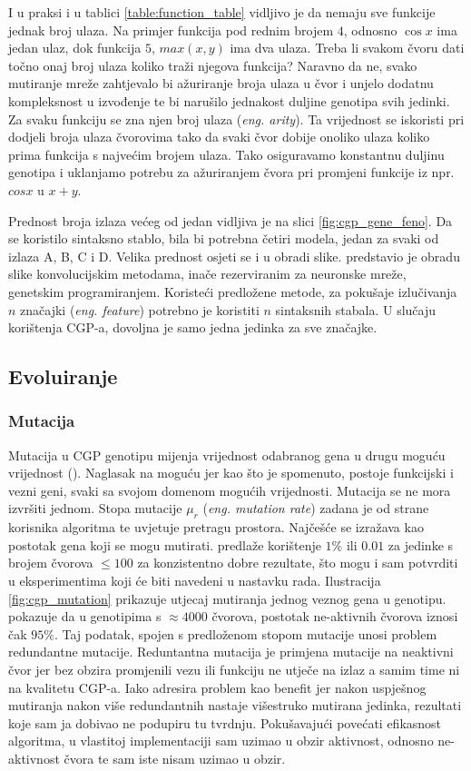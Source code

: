 I u praksi i u tablici \ref{table:function_table} vidljivo je da nemaju sve funkcije jednak broj ulaza.
Na primjer funkcija pod rednim brojem $4$, odnosno $\cos{x}$ ima jedan ulaz, dok funkcija $5$, $max(x, y)$ ima dva ulaza.
Treba li svakom čvoru dati točno onaj broj ulaza koliko traži njegova funkcija?
Naravno da ne, svako mutiranje mreže zahtjevalo bi ažuriranje broja ulaza u čvor i unjelo dodatnu kompleksnost u izvođenje te bi narušilo jednakost duljine genotipa svih jedinki.
Za svaku funkciju se zna njen broj ulaza (\emph{eng. arity}).
Ta vrijednost se iskoristi pri dodjeli broja ulaza čvorovima tako da svaki čvor dobije onoliko ulaza koliko prima funkcija s najvećim brojem ulaza.
Tako osiguravamo konstantnu duljinu genotipa i uklanjamo potrebu za ažuriranjem čvora pri promjeni funkcije iz npr. $cos{x}$ u $x + y$.

Prednost broja izlaza većeg od jedan vidljiva je na slici \ref{fig:cgp_gene_feno}.
Da se koristilo sintaksno stablo, bila bi potrebna četiri modela, jedan za svaki od izlaza A, B, C i D.
Velika prednost osjeti se i u obradi slike.
\cite{conv_gp} predstavio je obradu slike konvolucijskim metodama, inače rezerviranim za neuronske mreže, genetskim programiranjem.
Koristeći predložene metode, za pokušaje izlučivanja $n$ značajki (\emph{eng. feature}) potrebno je koristiti $n$ sintaksnih stabala.
U slučaju korištenja CGP-a, dovoljna je samo jedna jedinka za sve značajke.

\subsection{Evoluiranje}

\subsubsection{Mutacija}
Mutacija u CGP genotipu mijenja vrijednost odabranog gena u drugu moguću vrijednost (\cite{cgp}).
Naglasak na moguću jer kao što je spomenuto, postoje funkcijski i vezni geni, svaki sa svojom domenom mogućih vrijednosti.
Mutacija se ne mora izvršiti jednom.
Stopa mutacije $\mu_r$ (\emph{eng. mutation rate}) zadana je od strane korisnika algoritma te uvjetuje pretragu prostora.
Najčešće se izražava kao postotak gena koji se mogu mutirati.
\cite{cgp} predlaže korištenje $1\%$ ili $0.01$ za jedinke s brojem čvorova $\leq 100$ za konzistentno dobre rezultate, što mogu i sam potvrditi u eksperimentima koji će biti navedeni u nastavku rada.
Ilustracija \ref{fig:cgp_mutation} prikazuje utjecaj mutiranja jednog veznog gena u genotipu.
\cite{cgp_experiment} pokazuje da u genotipima s $\approx 4000$ čvorova, postotak ne-aktivnih čvorova iznosi čak $95\%$.
Taj podatak, spojen s predloženom stopom mutacije unosi problem redundantne mutacije.
Reduntantna mutacija je primjena mutacije na neaktivni čvor jer bez obzira promjenili vezu ili funkciju ne utječe na izlaz a samim time ni na kvalitetu CGP-a.
Iako \cite{cgp} adresira problem kao benefit jer nakon uspješnog mutiranja nakon više redundantnih nastaje višestruko mutirana jedinka, rezultati koje sam ja dobivao ne podupiru tu tvrdnju.
Pokušavajući povećati efikasnost algoritma, u vlastitoj implementaciji sam uzimao u obzir aktivnost, odnosno ne-aktivnost čvora te sam iste nisam uzimao u obzir.

